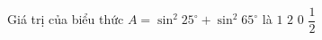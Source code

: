 

\begin{ex}%
	Giá trị của biểu thức $A=\sin^2 25^\circ+\sin^2 65^\circ$ là
	\choice
	{\True $1$}
	{$2$}
	{$0$}
	{$\dfrac12$}
\end{ex}

